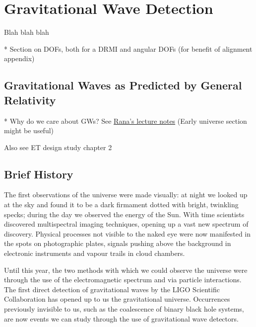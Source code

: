\chapter{Gravitational Wave Detection}
\label{c:gw-detection}

Blah blah blah

* Section on DOFs, both for a DRMI and angular DOFs (for benefit of alignment appendix)

\section{Gravitational Waves as Predicted by General Relativity}
* Why do we care about GWs? See \href{https://github.com/rxa254/StatisticalPhysics/blob/master/LectureNotes/ph2c_2015.pdf}{Rana's lecture notes}  (Early universe section might be useful)

Also see ET design study chapter 2

\section{Brief History}
The first observations of the universe were made visually: at night we looked up at the sky and found it to be a dark firmament dotted with bright, twinkling specks; during the day we observed the energy of the Sun. With time scientists discovered multispectral imaging techniques, opening up a vast new spectrum of discovery. Physical processes not visible to the naked eye were now manifested in the spots on photographic plates, signals pushing above the background in electronic instruments and vapour trails in cloud chambers.

Until this year, the two methods with which we could observe the universe were through the use of the electromagnetic spectrum and via particle interactions. The first direct detection of gravitational waves by the LIGO Scientific Collaboration has opened up to us the gravitational universe. Occurrences previously invisible to us, such as the coalescence of binary black hole systems, are now events we can study through the use of gravitational wave detectors.

